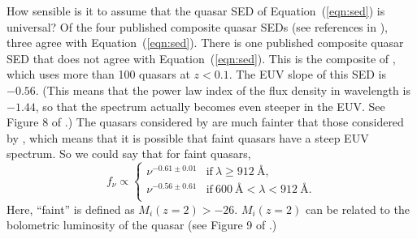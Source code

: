 \documentclass[a4paper,fleqn,usenatbib]{mnras}
\begin{document}
How sensible is it to assume that the quasar SED of
Equation~(\ref{eqn:sed}) is universal?  Of the four published
composite quasar SEDs (see references in
\citealt{2015MNRAS.449.4204L}), three agree with
Equation~(\ref{eqn:sed}).  There is one published composite quasar SED
that does not agree with Equation~(\ref{eqn:sed}).  This is the
composite of \citet{2004ApJ...615..135S}, which uses more than 100
quasars at $z<0.1$.  The EUV slope of this SED is $-0.56$.  (This
means that the power law index of the flux density in wavelength is
$-1.44$, so that the spectrum actually becomes even steeper in the
EUV.  See Figure 8 of \citealt{2015MNRAS.449.4204L}.)  The quasars
considered by \citet{2004ApJ...615..135S} are much fainter that those
considered by \citet{2015MNRAS.449.4204L}, which means that it is
possible that faint quasars have a steep EUV spectrum.  So we could
say that for faint quasars,
\begin{equation}
f_\nu\propto\begin{cases}
               \nu^{-0.61\pm 0.01} & \text{if}~\lambda\geq 912~\text{\AA},\\
               \nu^{-0.56\pm 0.61} & \text{if}~600~\text{\AA}<\lambda<912~\text{\AA}.\\                
               \end{cases}
\label{eqn:sed_faint}
\end{equation}
Here, ``faint'' is defined as $M_i(z=2)>-26$.  $M_i(z=2)$ can be
related to the bolometric luminosity of the quasar (see Figure 9 of
\citealt{2015MNRAS.449.4204L}.)
\end{document}
